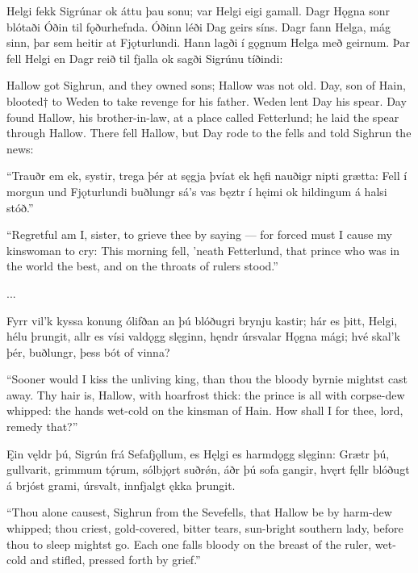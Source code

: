 Helgi fekk Sigrúnar ok áttu þau sonu; var Helgi eigi gamall. Dagr Hǫgna sonr blótaði Óðin til fǫðurhefnda. Óðinn léði Dag geirs síns. Dagr fann Helga, mág sinn, þar sem heitir at Fjǫturlundi. Hann lagði í gǫgnum Helga með geirnum. Þar fell Helgi en Dagr reið til fjalla ok sagði Sigrúnu tíðindi: 

Hallow got Sighrun, and they owned sons; Hallow was not old. Day, son of Hain, blooted† to Weden to take revenge for his father. Weden lent Day his spear. Day found Hallow, his brother-in-law, at a place called Fetterlund; he laid the spear through Hallow. There fell Hallow, but Day rode to the fells and told Sighrun the news:

“Trauðr em ek, systir, \hld trega þér at sęgja
þvíat ek hęfi nauðigr \hld nipti grætta:
Fell í morgun \hld und Fjǫturlundi
buðlungr sá’s vas \hld bęztr í hęimi
ok hildingum \hld á halsi stóð.”

“Regretful am I, sister, to grieve thee by saying — for forced must I cause my kinswoman to cry: This morning fell, ’neath Fetterlund, that prince who was in the world the best, and on the throats of rulers stood.”

...

Fyrr vil’k kyssa \hld konung ólifðan
an þú blóðugri \hld brynju kastir;
hár es þitt, Helgi, \hld hélu þrungit,
allr es vísi \hld valdǫgg slęginn,
hęndr úrsvalar \hld Hǫgna mági;
hvé skal’k þér, buðlungr, \hld þess bót of vinna? 

“Sooner would I kiss the unliving king, than thou the bloody byrnie mightst cast away. Thy hair is, Hallow, with hoarfrost thick: the prince is all with corpse-dew whipped: the hands wet-cold on the kinsman of Hain. How shall I for thee, lord, remedy that?”

Ęin vęldr þú, Sigrún \hld frá Sefafjǫllum,
es Hęlgi es \hld harmdǫgg slęginn:
Grætr þú, gullvarit, \hld grimmum tǫ́rum,
sólbjǫrt suðrǿn, \hld áðr þú sofa gangir,
hvęrt fęllr blóðugt \hld á brjóst grami,
úrsvalt, innfjalgt \hld ękka þrungit.

“Thou alone causest, Sighrun from the Sevefells, that Hallow be by harm-dew whipped; thou criest, gold-covered, bitter tears, sun-bright southern lady, before thou to sleep mightst go. Each one falls bloody on the breast of the ruler, wet-cold and stifled, pressed forth by grief.”
